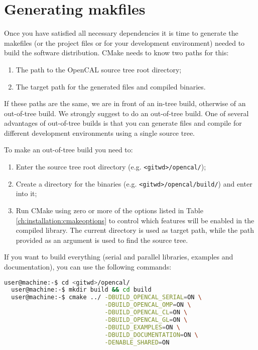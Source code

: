 
\section{Generating makfiles}

Once you have satisfied all necessary dependencies it is time to
generate the makefiles (or the project files or for your development
environment) needed to build the software distribution. CMake needs to
know two paths for this:
\begin{enumerate}
\item The path to the OpenCAL source tree root directory;
\item The target path for the generated files and compiled binaries.
\end{enumerate}

If these paths are the same, we are in front of an in-tree build,
otherwise of an out-of-tree build. We strongly suggest to do an
out-of-tree build. One of several advantages of out-of-tree builds is
that you can generate files and compile for different development
environments using a single source tree.

To make an out-of-tree build you need to:
\begin{enumerate}
\item Enter the source tree root directory (e.g. \verb'<gitwd>/opencal/');
\item Create a directory for the binaries
  (e.g. \verb'<gitwd>/opencal/build/') and enter into it;
\item Run CMake using zero or more of the options listed in Table
  \ref{ch:installation:cmakeoptions} to control which features will be
  enabled in the compiled library. The current directory is used as
  target path, while the path provided as an argument is used to find
  the source tree.
\end{enumerate}

If you want to build everything (serial and parallel libraries,
examples and documentation), you can use the following commands:

\begin{lstlisting}[numbers=none,language=bash,label={ch:quickstart:simplebuild}]
  user@machine:-$ cd <gitwd>/opencal/
  user@machine:-$ mkdir build && cd build
  user@machine:-$ cmake ../ -DBUILD_OPENCAL_SERIAL=ON \
                            -DBUILD_OPENCAL_OMP=ON \
                            -DBUILD_OPENCAL_CL=ON \
                            -DBUILD_OPENCAL_GL=ON \
                            -DBUILD_EXAMPLES=ON \
                            -DBUILD_DOCUMENTATION=ON \
                            -DENABLE_SHARED=ON
\end{lstlisting}

